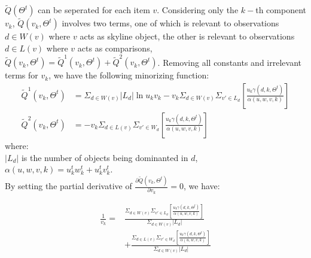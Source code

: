 \documentclass{article}
\begin{document}
$\tilde{Q}(\Theta^t)$ can be seperated for each item $v$. Considering only the $k-$th component $v_k$, $\tilde{Q}(v_k,\Theta^t)$ involves two terms, one of which is relevant to observations $d\in W(v)$ where $v$ acts as skyline object, the other is relevant to observations $d \in L(v)$ where $v$ acts as comparisons, $\tilde{Q}(v_k,\Theta^t)=\tilde{Q}^1(v_k,\Theta^t)+\tilde{Q}^2(v_k,\Theta^t)$. Removing all constants and irrelevant terms for $v_k$, we have the following minorizing function:
\begin{equation}
\begin{aligned}
\tilde{Q}^1(v_k,\Theta^t) & =\Sigma_{d\in W(v)} |L_d| \ln u_k v_k -v_k\Sigma_{d\in W(v)}\Sigma_{v'\in L_d} [\frac{u_k \gamma(d,k,\Theta^t)}{ \alpha(u,w,v,k)}]\\ \nonumber
\tilde{Q}^2(v_k,\Theta^t) & =-v_k \Sigma_{d\in L(v)}\Sigma_{v'\in W_d} [\frac{u_k \gamma(d,k,\Theta^t)}{\alpha(u,w,v,k)}]
\end{aligned}
\end{equation}
 where:\\

 $|L_d|$ is the number of objects being dominanted in $d$,
 \\ $\alpha(u,w,v,k)=u_k^t w_k^t+u_k^t v_k^t$.
 \\

By setting the partial derivative of $\frac{\partial \tilde{Q}(v_k,\Theta^t)}{\partial v_k}=0$, we have:


\begin{equation}
\begin{aligned}
\frac{1}{v_k}= &\frac{\Sigma_{d\in W(v)}\Sigma_{v'\in L_d} [\frac{u_k \gamma(d,k,\Theta^t)}{ \alpha(u,w,v,k)}]}{\Sigma_{d\in W(v)}|L_d|}\\\nonumber
 & + \frac{\Sigma_{d\in L(v)}\Sigma_{v'\in W_d} [\frac{u_k \gamma(d,k,\Theta^t)}{\alpha(u,w,v,k)}] }{\Sigma_{d\in W(v)}|L_d|}
\end{aligned}
\end{equation}\\
\end{document}
